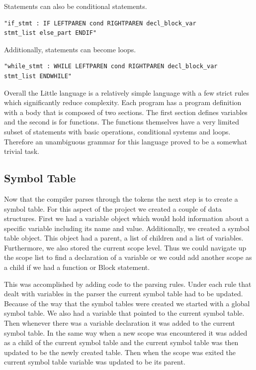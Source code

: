 \documentclass[12pt]{article}
\begin{document}
            Statements can also be conditional statements.
            \begin{verbatim}
"if_stmt : IF LEFTPAREN cond RIGHTPAREN decl_block_var
stmt_list else_part ENDIF"
            \end{verbatim}  
           
            Additionally, statements can become loops.
            \begin{verbatim}
"while_stmt : WHILE LEFTPAREN cond RIGHTPAREN decl_block_var
stmt_list ENDWHILE"
            \end{verbatim}
           
            
            Overall the Little language is a relatively simple language with a few strict rules which significantly reduce complexity.  Each program has a program definition with a body that is composed of two sections.  The first section defines variables and the second is for functions.  The functions themselves have a very limited subset of statements with basic operations, conditional systems and loops.  Therefore an unambiguous grammar for this language proved to be a somewhat trivial task.  
            

        \subsection{Symbol Table}
            Now that the compiler parses through the tokens the next step is to create a symbol table.  For this aspect of the project we created a couple of data structures.  First we had a variable object which would hold information about a specific variable including its name and value.  Additionally, we created a symbol table object.  This object had a parent, a list of children and a list of variables.  Furthermore, we also stored the current scope level.  Thus we could navigate up the scope list to find a declaration of a variable or we could add another scope as a child if we had a function or Block statement.  
            
            This was accomplished by adding code to the parsing rules.  Under each rule that dealt with variables in the parser the current symbol table had to be updated.  Because of the way that the symbol tables were created we started with a global symbol table.  We also had a variable that pointed to the current symbol table.  Then whenever there was a variable declaration it was added to the current symbol table.  In the same way when a new scope was encountered it was added as a child of the current symbol table and the current symbol table was then updated to be the newly created table.  Then when the scope was exited the current symbol table variable was updated to be its parent. 
            
\end{document}
